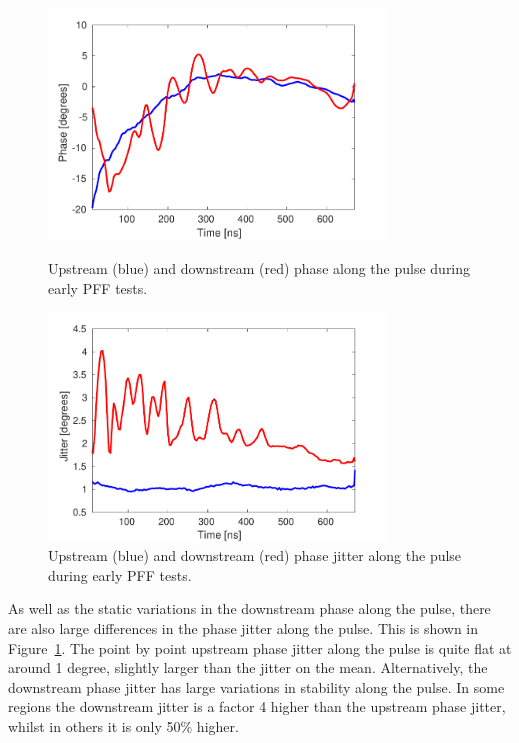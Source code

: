 \begin{figure}
  \centering
  \includegraphics[width=0.8\textwidth]{Figures/propagation/origPhaseAlong}
  \caption{Upstream (blue) and downstream (red) phase along the pulse during early PFF tests.}
  \label{f:origPhaseAlong}
  \includegraphics[width=0.8\textwidth]{Figures/propagation/origJitterAlong}
  \caption{Upstream (blue) and downstream (red) phase jitter along the pulse during early PFF tests.}
  \label{f:origJitterAlong}
\end{figure}


As well as the static variations in the downstream phase along the pulse, there are also large differences in the phase jitter along the pulse. This is shown in Figure~\ref{f:origJitterAlong}. The point by point upstream phase jitter along the pulse is quite flat at around 1 degree, slightly larger than the jitter on the mean. Alternatively, the downstream phase jitter has large variations in stability along the pulse. In some regions the downstream jitter is a factor 4 higher than the upstream phase jitter, whilst in others it is only 50\% higher.


